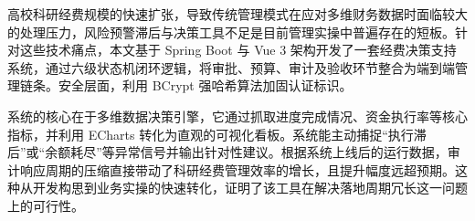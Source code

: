 \makecntitle
\abstract
{
	高校科研经费规模的快速扩张，导致传统管理模式在应对多维财务数据时面临较大的处理压力，风险预警滞后与决策工具不足是目前管理实操中普遍存在的短板。针对这些技术痛点，本文基于 Spring Boot 与 Vue 3 架构开发了一套经费决策支持系统，通过六级状态机闭环逻辑，将审批、预算、审计及验收环节整合为端到端管理链条。安全层面，利用 BCrypt 强哈希算法加固认证标识。

    系统的核心在于多维数据决策引擎，它通过抓取进度完成情况、资金执行率等核心指标，并利用 ECharts 转化为直观的可视化看板。系统能主动捕捉“执行滞后”或“余额耗尽”等异常信号并输出针对性建议。根据系统上线后的运行数据，审计响应周期的压缩直接带动了科研经费管理效率的增长，且提升幅度远超预期。这种从开发构思到业务实操的快速转化，证明了该工具在解决落地周期冗长这一问题上的可行性。
}


\makeentitle

